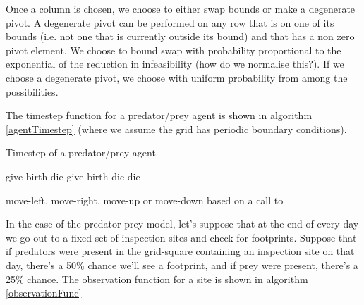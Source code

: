 \documentclass{article}
\begin{document}
Once a column is chosen, we choose to either swap bounds or make a degenerate pivot. A degenerate pivot can be performed on any row that is on one of its bounds (i.e. not one that is currently outside its bound) and that has a non zero pivot element. We choose to bound swap with probability proportional to the exponential of the reduction in infeasibility (how do we normalise this?). If we choose a degenerate pivot, we choose with uniform probability from among the possibilities.

The timestep function for a predator/prey agent is shown in algorithm \ref{agentTimestep} (where we assume the grid has periodic boundary conditions).

\begin{algorithm}
	\caption{Timestep of a predator/prey agent}
	\label{agentTimestep}
	\begin{algorithmic}
		\State\Return give-birth 
		\EndIf
		\State\Return die
		\EndIf
		\Else
		\State\Return give-birth
		\EndIf
		\State\Return die
		\EndIf
		\State\Return die 
		\EndIf
		
		\EndIf
		\State \Return move-left, move-right, move-up or move-down based on a call to 
		\EndFunction
	\end{algorithmic}
\end{algorithm}

In the case of the predator prey model, let's suppose that at the end of every day we go out to a fixed set of inspection sites and check for footprints. Suppose that if predators were present in the grid-square containing an inspection site on that day, there's a 50\% chance we'll see a footprint, and if prey were present, there's a 25\% chance. The observation function for a site is shown in algorithm \ref{observationFunc}
\end{document}
